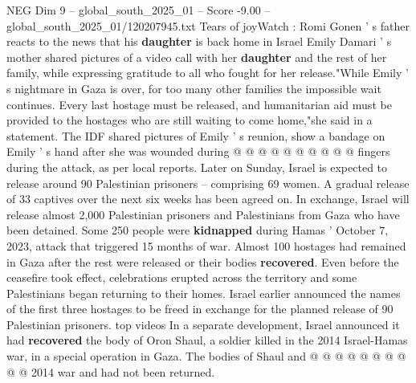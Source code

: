 \begin{textsample}{NEG Dim 9 – global\_south\_2025\_01 – Score -9.00 – global\_south\_2025\_01/120207945.txt}
Tears of joyWatch : Romi Gonen ' s father reacts to the news that his \textbf{daughter} is back home in Israel Emily Damari ' s mother shared pictures of a video call with her \textbf{daughter} and the rest of her family, while expressing gratitude to all who fought for her release."While Emily ' s nightmare in Gaza is over, for too many other families the impossible wait continues.
Every last hostage must be released, and humanitarian aid must be provided to the hostages who are still waiting to come home,"she said in a statement.
The IDF shared pictures of Emily ' s reunion, show a bandage on Emily ' s hand after she was wounded during @ @ @ @ @ @ @ @ @ @ fingers during the attack, as per local reports.
Later on Sunday, Israel is expected to release around 90 Palestinian prisoners -- comprising 69 women.
A gradual release of 33 captives over the next six weeks has been agreed on.
In exchange, Israel will release almost 2,000 Palestinian prisoners and Palestinians from Gaza who have been detained.
Some 250 people were \textbf{kidnapped} during Hamas ' October 7, 2023, attack that triggered 15 months of war.
Almost 100 hostages had remained in Gaza after the rest were released or their bodies \textbf{recovered}.
Even before the ceasefire took effect, celebrations erupted across the territory and some Palestinians began returning to their homes.
Israel earlier announced the names of the first three hostages to be freed in exchange for the planned release of 90 Palestinian prisoners. top videos In a separate development, Israel announced it had \textbf{recovered} the body of Oron Shaul, a soldier killed in the 2014 Israel-Hamas war, in a special operation in Gaza.
The bodies of Shaul and @ @ @ @ @ @ @ @ @ @ 2014 war and had not been returned.

\end{textsample}
